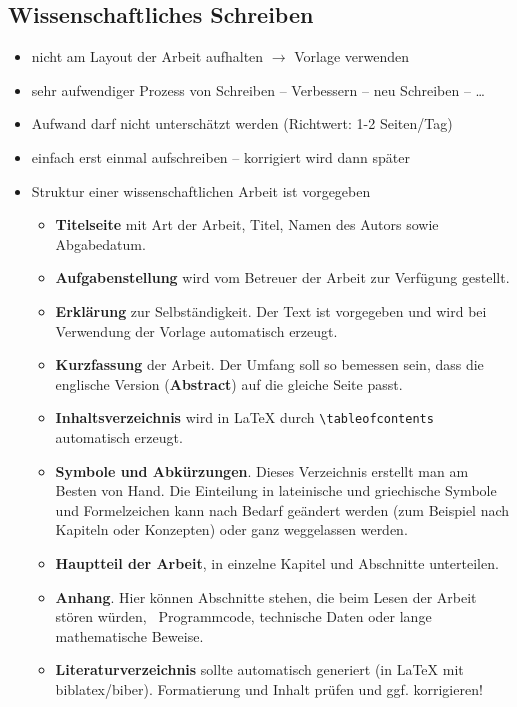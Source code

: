 \subsection*{Wissenschaftliches Schreiben}
\label{sec:Wissenschaftliches Schreiben}
\begin{itemize}
  \item nicht am Layout der Arbeit aufhalten $\rightarrow$ Vorlage verwenden
  \item sehr aufwendiger Prozess von Schreiben -- Verbessern -- neu Schreiben -- \ldots
  \item Aufwand darf nicht unterschätzt werden (Richtwert: 1-2 Seiten/Tag)
  \item einfach erst einmal aufschreiben --  korrigiert wird dann später
  \item Struktur einer wissenschaftlichen Arbeit ist vorgegeben
    \begin{itemize}
      \item \textbf{Titelseite} mit Art der Arbeit, Titel, Namen des Autors sowie Abgabedatum.
      \item \textbf{Aufgabenstellung} wird vom Betreuer der Arbeit zur Verfügung
        gestellt.
      \item \textbf{Erklärung} zur Selbständigkeit.
        Der Text ist vorgegeben und wird bei Verwendung der Vorlage automatisch erzeugt.
      \item \textbf{Kurzfassung} der Arbeit.
        Der Umfang soll so bemessen sein, dass die englische Version (\textbf{Abstract}) auf die gleiche Seite passt.
      \item \textbf{Inhaltsverzeichnis} wird in \LaTeX{} durch \verb|\tableofcontents| automatisch erzeugt.
      \item \textbf{Symbole und Abkürzungen}.
        Dieses Verzeichnis erstellt man am Besten von Hand.
        Die Einteilung in lateinische und griechische Symbole und Formelzeichen kann nach Bedarf geändert werden (zum Beispiel nach Kapiteln oder Konzepten) oder ganz weggelassen werden.
      \item \textbf{Hauptteil der Arbeit}, in einzelne Kapitel und Abschnitte unterteilen.
      \item \textbf{Anhang}.
        Hier können Abschnitte stehen, die beim Lesen der Arbeit stören würden, \zB\ Programmcode, technische Daten oder lange mathematische Beweise.
      \item \textbf{Literaturverzeichnis} sollte automatisch generiert (in \LaTeX{} \zB mit biblatex/biber). Formatierung und Inhalt prüfen und ggf. korrigieren!

\end{itemize}
\end{itemize}
